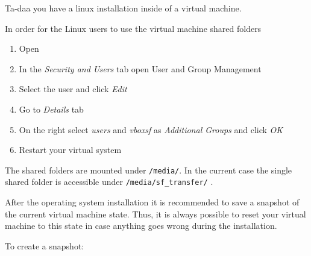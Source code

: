 Ta-daa you have a linux installation inside of a virtual machine.


In order for the Linux users to use the virtual machine shared folders

\begin{enumerate}[noitemsep]
 \item Open \marktool{\yastname}
 \item In the \textit{Security and Users} tab open {User and Group Management}
 \item Select the user and click \textit{Edit}
 \item Go to \textit{Details} tab
 \item On the right select \textit{users} and \textit{vboxsf} as \textit{Additional Groups} and click \textit{OK}
 \item Restart your virtual system
\end{enumerate}

The shared folders are mounted under \verb+/media/+. In the current case the single shared folder is accessible under \verb+/media/sf_transfer/+ .


After the operating system installation it is recommended to save a snapshot of the current virtual machine state. Thus, it is always possible to reset your virtual machine to this state in case anything goes wrong during the \marktool{\toolname} installation.

To create a snapshot:

